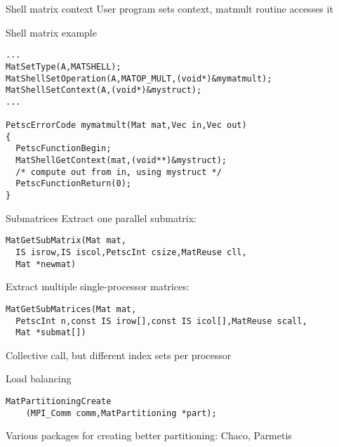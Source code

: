 \begin{longversion}
\begin{numberedframe}{Shell matrix context}
User program sets context, matmult routine accesses it
\end{numberedframe}

\begin{numberedframe}{Shell matrix example}
\begin{lstlisting}
...
MatSetType(A,MATSHELL);
MatShellSetOperation(A,MATOP_MULT,(void*)&mymatmult);
MatShellSetContext(A,(void*)&mystruct);
...

PetscErrorCode mymatmult(Mat mat,Vec in,Vec out)
{
  PetscFunctionBegin;
  MatShellGetContext(mat,(void**)&mystruct);
  /* compute out from in, using mystruct */
  PetscFunctionReturn(0);
}
\end{lstlisting}
\end{numberedframe}


\begin{numberedframe}{Submatrices}
Extract one parallel submatrix:
\begin{lstlisting}
MatGetSubMatrix(Mat mat,
  IS isrow,IS iscol,PetscInt csize,MatReuse cll,
  Mat *newmat)
\end{lstlisting}
Extract multiple single-processor matrices:
{\small
\begin{lstlisting}
MatGetSubMatrices(Mat mat,
  PetscInt n,const IS irow[],const IS icol[],MatReuse scall,
  Mat *submat[])
\end{lstlisting}
}
Collective call, but different index sets per processor
\end{numberedframe}

\begin{numberedframe}{Load balancing}

\begin{lstlisting}
MatPartitioningCreate
    (MPI_Comm comm,MatPartitioning *part);
\end{lstlisting}
Various packages for creating better partitioning: Chaco, Parmetis



\end{numberedframe}

\end{longversion}
\endinput

